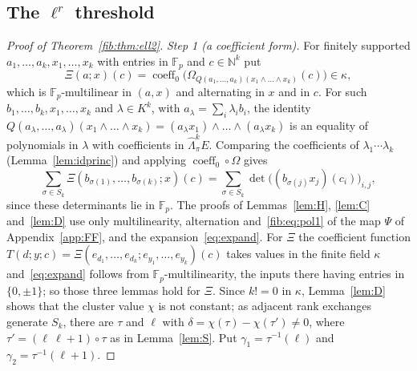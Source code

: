 \documentclass[11pt]{amsart}
\theoremstyle{definition}
\theoremstyle{remark}
\numberwithin{equation}{section}
\newcommand{\N}{\mathbb N}
\newcommand{\F}{\mathbb F}
\newcommand{\coeff}{\operatorname{coeff}}
\theoremstyle{plain}
\theoremstyle{definition}
\theoremstyle{plain}
\begin{document}
\subsection{The \texorpdfstring{$\ell^r$}{l\textasciicircum r} threshold}\label{frc:ssec:threshold}
\begin{proof}[Proof of Theorem~\ref{fib:thm:ell2}]
\emph{Step 1 (a coefficient form).} For finitely supported $a_1,\dots,a_k,x_1,\dots,x_k$ with entries in $\F_p$ and
$c\in\N^k$ put
\[
 \Xi(a;x)(c)=\coeff_0\bigl(\Omega_{Q(a_1,\dots,a_k)(x_1\wedge\dots\wedge x_k)}(c)\bigr)\in\kappa,
\]
which is $\F_p$\nobreakdash-multilinear in $(a,x)$ and alternating in $x$ and in $c$. For such $b_1,\dots,b_k,x_1,\dots,x_k$
and $\lambda\in K^k$, with $a_\lambda=\sum_i\lambda_ib_i$, the identity
$Q(a_\lambda,\dots,a_\lambda)(x_1\wedge\dots\wedge x_k)=(a_\lambda x_1)\wedge\dots\wedge(a_\lambda x_k)$ is an equality of
polynomials in $\lambda$ with coefficients in $\widehat\Lambda^k_\pi E$. Comparing the coefficients of
$\lambda_1\cdots\lambda_k$ (Lemma~\ref{lem:idprinc}) and applying $\coeff_0\circ\Omega$ gives
\begin{equation}\label{fib:eq:pol1}
 \sum_{\sigma\in S_k}\Xi(b_{\sigma(1)},\dots,b_{\sigma(k)};x)(c)
 =\sum_{\sigma\in S_k}\det\bigl((b_{\sigma(j)}x_j)(c_i)\bigr)_{i,j},
\end{equation}
since these determinants lie in $\F_p$. The proofs of Lemmas~\ref{lem:H}, \ref{lem:C} and~\ref{lem:D} use only
multilinearity, alternation and~\eqref{fib:eq:pol1} of the map $\Psi$ of Appendix~\ref{app:FF}, and the
expansion~\eqref{eq:expand}. For $\Xi$ the coefficient function
$T(d;y;c)=\Xi(e_{d_1},\dots,e_{d_k};e_{y_1},\dots,e_{y_k})(c)$ takes values in the finite field $\kappa$
and~\eqref{eq:expand} follows from $\F_p$\nobreakdash-multilinearity, the inputs there having entries in $\{0,\pm1\}$; so
those three lemmas hold for $\Xi$. Since $k!=0$ in $\kappa$, Lemma~\ref{lem:D} shows that the cluster value $\chi$ is
not constant; as adjacent rank exchanges generate $S_k$, there are $\tau$ and $\ell$ with
$\delta=\chi(\tau)-\chi(\tau')\ne0$, where $\tau'=(\ell\ \ell{+}1)\circ\tau$ as in Lemma~\ref{lem:S}. Put
$\gamma_1=\tau^{-1}(\ell)$ and $\gamma_2=\tau^{-1}(\ell+1)$.


\end{proof}
\end{document}

